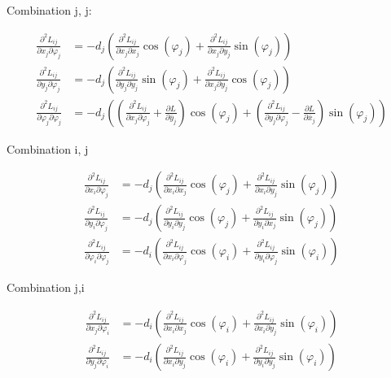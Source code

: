 Combination j, j:

\begin{align}
\frac{\partial^2 L_{ij}}{\partial x_{j} \partial \varphi_{j}} &= -d_{j}\left( \frac{\partial^2 L_{ij}}{\partial x_{j} \partial x_{j}}\cos(\varphi_{j}) + \frac{\partial^2 L_{ij}}{\partial x_{j} \partial y_{j}}\sin(\varphi_{j})\right) \\
\frac{\partial^2 L_{ij}}{\partial y_{j} \partial \varphi_{j}} &= -d_{j}\left( \frac{\partial^2 L_{ij}}{\partial y_{j} \partial y_{j}}\sin(\varphi_{j}) + \frac{\partial^2 L_{ij}}{\partial x_{j} \partial y_{j}}\cos(\varphi_{j})\right) \\
\frac{\partial^2 L_{ij}}{\partial \varphi_{j} \partial \varphi_{j}} &= -d_{j}\left(\left(\frac{\partial^2 L_{ij}}{\partial x_{j} \partial \varphi_{j}} + \frac{\partial L}{\partial \bar{y}_{j}}\right)\cos(\varphi_{j}) + \left(\frac{\partial^2 L_{ij}}{\partial y_{j} \partial \varphi_{j}} - \frac{\partial L}{\partial \bar{x}_{j}}\right)\sin(\varphi_{j})\right)
\end{align}

Combination i, j

\begin{align}
\frac{\partial^2 L_{ij}}{\partial x_{i} \partial \varphi_{j}} &= -d_{j}\left( \frac{\partial^2 L_{ij}}{\partial x_{i} \partial x_{j}}\cos(\varphi_{j}) + \frac{\partial^2 L_{ij}}{\partial x_{i} \partial y_{j}}\sin(\varphi_{j})\right) \\
\frac{\partial^2 L_{ij}}{\partial y_{i} \partial \varphi_{j}} &= -d_{j}\left( \frac{\partial^2 L_{ij}}{\partial y_{i} \partial y_{j}}\cos(\varphi_{j}) + \frac{\partial^2 L_{ij}}{\partial y_{i} \partial x_{j}}\sin(\varphi_{j}) \right) \\
\frac{\partial^2 L_{ij}}{\partial \varphi_{i} \partial \varphi_{j}} &= -d_{i}\left( \frac{\partial^2 L_{ij}}{\partial x_{i} \partial \varphi_{j}}\cos(\varphi_{i}) + \frac{\partial^2 L_{ij}}{\partial y_{i} \partial \varphi_{j}}\sin(\varphi_{i})\right)
\end{align}

Combination j,i

\begin{align}
\frac{\partial^2 L_{ij}}{\partial x_{j} \partial \varphi_{i}} &= -d_{i}\left( \frac{\partial^2 L_{ij}}{\partial x_{i} \partial x_{j}}\cos(\varphi_{i}) + \frac{\partial^2 L_{ij}}{\partial x_{i} \partial y_{j}}\sin(\varphi_{i})\right) \\
\frac{\partial^2 L_{ij}}{\partial y_{j} \partial \varphi_{i}} &= -d_{i}\left( \frac{\partial^2 L_{ij}}{\partial x_{i} \partial y_{j}}\cos(\varphi_{i}) + \frac{\partial^2 L_{ij}}{\partial y_{i} \partial y_{j}}\sin(\varphi_{i}) \right)
\end{align}



